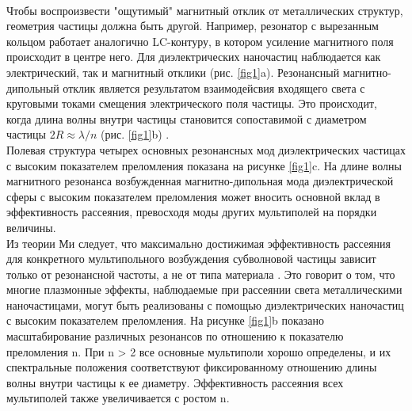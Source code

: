 \\
\hspace*{2mm}
Чтобы воспроизвести "ощутимый" магнитный отклик от металлических структур, геометрия частицы должна быть другой. Например, резонатор с вырезанным кольцом  работает аналогично LC-контуру, в котором усиление магнитного поля происходит в центре него. Для диэлектрических наночастиц наблюдается как электрический, так и магнитный отклики (рис. \ref{fig1}a). Резонансный магнитно-дипольный отклик является результатом взаимодейсвия входящего света с круговыми токами смещения электрического поля частицы. Это происходит, когда длина волны внутри частицы становится сопоставимой с диаметром частицы $2R \approx \lambda/n$ (рис. \ref{fig1}b) \cite{kuznetsov2016optically}. 
\\
\hspace*{2mm}
Полевая структура четырех основных резонансных мод диэлектрических частицах с высоким показателем преломления показана на рисунке \ref{fig1}c. На длине волны магнитного резонанса возбужденная магнитно-дипольная мода диэлектрической сферы с высоким показателем преломления может вносить основной вклад в эффективность рассеяния, превосходя моды других мультиполей на порядки величины.
\\
\hspace*{2mm}
Из теории Ми следует, что максимально достижимая эффективность рассеяния для конкретного мультипольного возбуждения субволновой частицы зависит только от резонансной частоты, а не от типа материала \cite{schuller2009general}. Это говорит о том, что многие плазмонные эффекты, наблюдаемые при рассеянии света металлическими наночастицами, могут быть реализованы с помощью диэлектрических наночастиц с высоким показателем преломления. На рисунке \ref{fig1}b показано масштабирование различных резонансов по отношению к показателю преломления n. При n > 2 все основные мультиполи хорошо определены, и их спектральные положения соответствуют фиксированному отношению длины волны внутри частицы к ее диаметру. Эффективность рассеяния всех мультиполей также увеличивается с ростом n.

